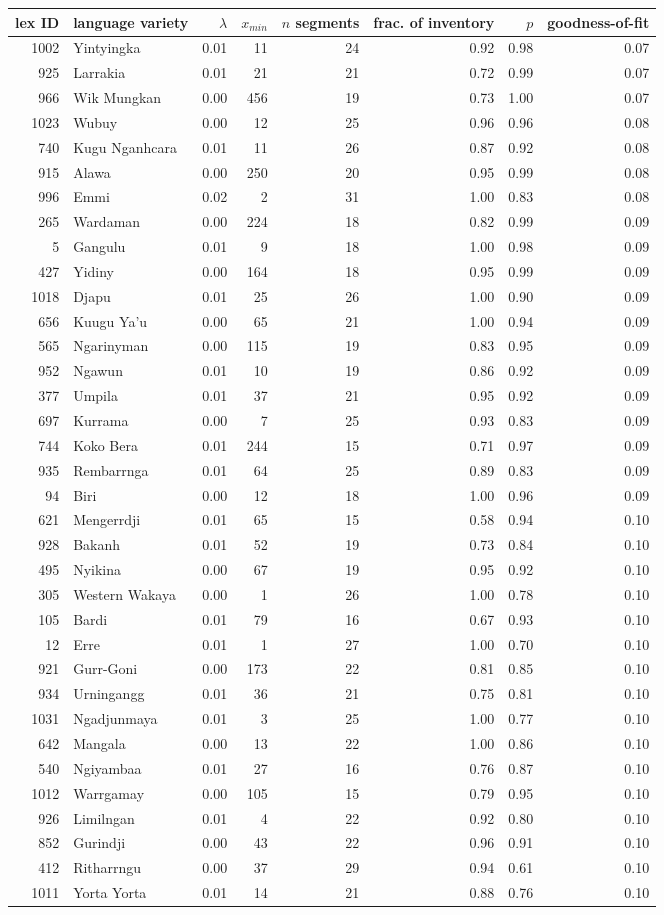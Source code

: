 \begin{longtable}[]{@{}rlrrrrrr@{}}
\toprule
\textbf{lex ID} & \textbf{language variety} & \(\lambda\) & \(x_{min}\)
& \(n\) \textbf{segments} & \textbf{frac. of inventory} & \(p\) &
\textbf{goodness-of-fit}\tabularnewline
\midrule
\endhead
1002 & Yintyingka & 0.01 & 11 & 24 & 0.92 & 0.98 & 0.07\tabularnewline
925 & Larrakia & 0.01 & 21 & 21 & 0.72 & 0.99 & 0.07\tabularnewline
966 & Wik Mungkan & 0.00 & 456 & 19 & 0.73 & 1.00 & 0.07\tabularnewline
1023 & Wubuy & 0.00 & 12 & 25 & 0.96 & 0.96 & 0.08\tabularnewline
740 & Kugu Nganhcara & 0.01 & 11 & 26 & 0.87 & 0.92 &
0.08\tabularnewline
915 & Alawa & 0.00 & 250 & 20 & 0.95 & 0.99 & 0.08\tabularnewline
996 & Emmi & 0.02 & 2 & 31 & 1.00 & 0.83 & 0.08\tabularnewline
265 & Wardaman & 0.00 & 224 & 18 & 0.82 & 0.99 & 0.09\tabularnewline
5 & Gangulu & 0.01 & 9 & 18 & 1.00 & 0.98 & 0.09\tabularnewline
427 & Yidiny & 0.00 & 164 & 18 & 0.95 & 0.99 & 0.09\tabularnewline
1018 & Djapu & 0.01 & 25 & 26 & 1.00 & 0.90 & 0.09\tabularnewline
656 & Kuugu Ya'u & 0.00 & 65 & 21 & 1.00 & 0.94 & 0.09\tabularnewline
565 & Ngarinyman & 0.00 & 115 & 19 & 0.83 & 0.95 & 0.09\tabularnewline
952 & Ngawun & 0.01 & 10 & 19 & 0.86 & 0.92 & 0.09\tabularnewline
377 & Umpila & 0.01 & 37 & 21 & 0.95 & 0.92 & 0.09\tabularnewline
697 & Kurrama & 0.00 & 7 & 25 & 0.93 & 0.83 & 0.09\tabularnewline
744 & Koko Bera & 0.01 & 244 & 15 & 0.71 & 0.97 & 0.09\tabularnewline
935 & Rembarrnga & 0.01 & 64 & 25 & 0.89 & 0.83 & 0.09\tabularnewline
94 & Biri & 0.00 & 12 & 18 & 1.00 & 0.96 & 0.09\tabularnewline
621 & Mengerrdji & 0.01 & 65 & 15 & 0.58 & 0.94 & 0.10\tabularnewline
928 & Bakanh & 0.01 & 52 & 19 & 0.73 & 0.84 & 0.10\tabularnewline
495 & Nyikina & 0.00 & 67 & 19 & 0.95 & 0.92 & 0.10\tabularnewline
305 & Western Wakaya & 0.00 & 1 & 26 & 1.00 & 0.78 & 0.10\tabularnewline
105 & Bardi & 0.01 & 79 & 16 & 0.67 & 0.93 & 0.10\tabularnewline
12 & Erre & 0.01 & 1 & 27 & 1.00 & 0.70 & 0.10\tabularnewline
921 & Gurr-Goni & 0.00 & 173 & 22 & 0.81 & 0.85 & 0.10\tabularnewline
934 & Urningangg & 0.01 & 36 & 21 & 0.75 & 0.81 & 0.10\tabularnewline
1031 & Ngadjunmaya & 0.01 & 3 & 25 & 1.00 & 0.77 & 0.10\tabularnewline
642 & Mangala & 0.00 & 13 & 22 & 1.00 & 0.86 & 0.10\tabularnewline
540 & Ngiyambaa & 0.01 & 27 & 16 & 0.76 & 0.87 & 0.10\tabularnewline
1012 & Warrgamay & 0.00 & 105 & 15 & 0.79 & 0.95 & 0.10\tabularnewline
926 & Limilngan & 0.01 & 4 & 22 & 0.92 & 0.80 & 0.10\tabularnewline
852 & Gurindji & 0.00 & 43 & 22 & 0.96 & 0.91 & 0.10\tabularnewline
412 & Ritharrngu & 0.00 & 37 & 29 & 0.94 & 0.61 & 0.10\tabularnewline
1011 & Yorta Yorta & 0.01 & 14 & 21 & 0.88 & 0.76 & 0.10\tabularnewline

\end{longtable}
